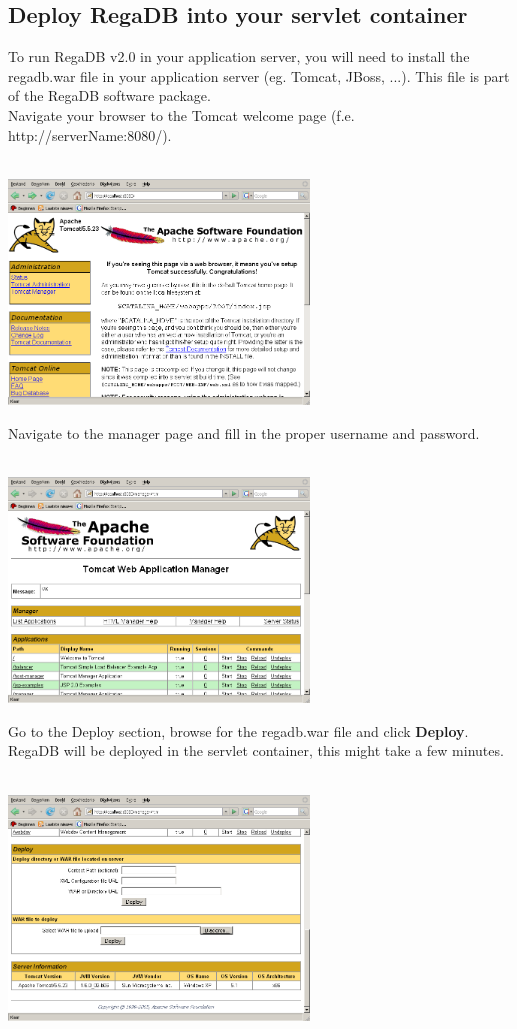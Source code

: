 \subsection{Deploy RegaDB into your servlet container}
To run RegaDB v2.0 in your application server, you will need to install the regadb.war file in your application server (eg. Tomcat, JBoss, ...). This file is part of the RegaDB software package.
\\
Navigate your browser to the Tomcat welcome page (f.e. http://serverName:8080/).
\\
\vspace{0.5cm}~ \\ \centerline{\includegraphics[width=8cm] {pics/nsis/tomcat_page.png}}
Navigate to the manager page and fill in the proper username and password.
\\
\vspace{0.5cm}~ \\ \centerline{\includegraphics[width=8cm] {pics/nsis/tomcat_page_manager_1.png}}
Go to the Deploy section, browse for the regadb.war file and click \textbf{Deploy}. RegaDB will be deployed in the servlet container, this might take a few minutes.
\\
\vspace{0.5cm}~ \\ \centerline{\includegraphics[width=8cm] {pics/nsis/tomcat_page_manager_2.png}}
